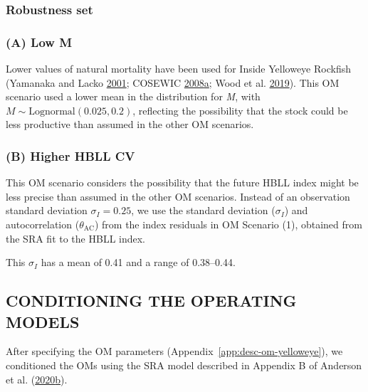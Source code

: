 \documentclass[11pt]{book}
\begin{document}
\hypertarget{sec:approach3-robustness}{%
\subsubsection{Robustness set}\label{sec:approach3-robustness}}

\hypertarget{sec:approach3-referenceA}{%
\subsubsection{(A) Low M}\label{sec:approach3-referenceA}}

Lower values of natural mortality have been used for Inside Yelloweye Rockfish (Yamanaka and Lacko \protect\hyperlink{ref-yamanaka2001}{2001}; COSEWIC \protect\hyperlink{ref-cosewic2008}{2008}\protect\hyperlink{ref-cosewic2008}{a}; Wood et al. \protect\hyperlink{ref-wood2019}{2019}). This OM scenario used a lower mean in the distribution for \emph{M}, with \(M \sim \textrm{Lognormal}(0.025, 0.2)\), reflecting the possibility that the stock could be less productive than assumed in the other OM scenarios.

\hypertarget{sec:approach3-referenceB}{%
\subsubsection{(B) Higher HBLL CV}\label{sec:approach3-referenceB}}

This OM scenario considers the possibility that the future HBLL index might be less precise than assumed in the other OM scenarios. Instead of an observation standard deviation \(\sigma_I = 0.25\), we use the standard deviation (\(\sigma_I\)) and autocorrelation (\(\theta_\textrm{AC}\)) from the index residuals in OM Scenario (1), obtained from the SRA fit to the HBLL index.

This \(\sigma_I\) has a mean of 0.41 and a range of 0.38--0.44.

\hypertarget{sec:approach3-conditioning}{%
\subsection{CONDITIONING THE OPERATING MODELS}\label{sec:approach3-conditioning}}

After specifying the OM parameters (Appendix~\ref{app:desc-om-yelloweye}), we conditioned the OMs using the SRA model described in Appendix B of Anderson et al. (\protect\hyperlink{ref-anderson2020gfmp}{2020}\protect\hyperlink{ref-anderson2020gfmp}{b}).
\end{document}

